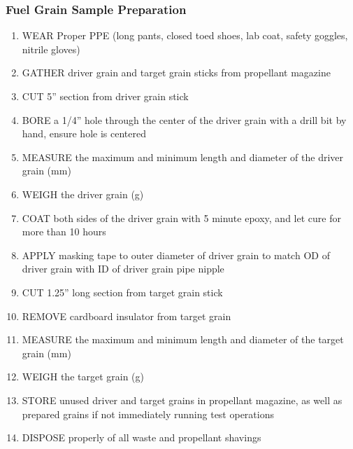 \subsubsection*{Fuel Grain Sample Preparation}
\begin{enumerate}
    \item WEAR Proper PPE (long pants, closed toed shoes, lab coat, safety goggles, nitrile gloves)
    \item GATHER driver grain and target grain sticks from propellant magazine
    \item CUT 5'' section from driver grain stick
    \item BORE a 1/4'' hole through the center of the driver grain with a drill bit by hand, ensure hole is centered
    \item MEASURE the maximum and minimum length and diameter of the driver grain (mm)
    \item WEIGH the driver grain (g)
    \item COAT both sides of the driver grain with 5 minute epoxy, and let cure for more than 10 hours
    \item APPLY masking tape to outer diameter of driver grain to match OD of driver grain with ID of driver grain pipe nipple
    \item CUT 1.25'' long section from target grain stick
    \item REMOVE cardboard insulator from target grain
    \item MEASURE the maximum and minimum length and diameter of the target grain (mm)
    \item WEIGH the target grain (g)
    \item STORE unused driver and target grains in propellant magazine, as well as prepared grains if not immediately running test operations
    \item DISPOSE properly of all waste and propellant shavings
\end{enumerate}

